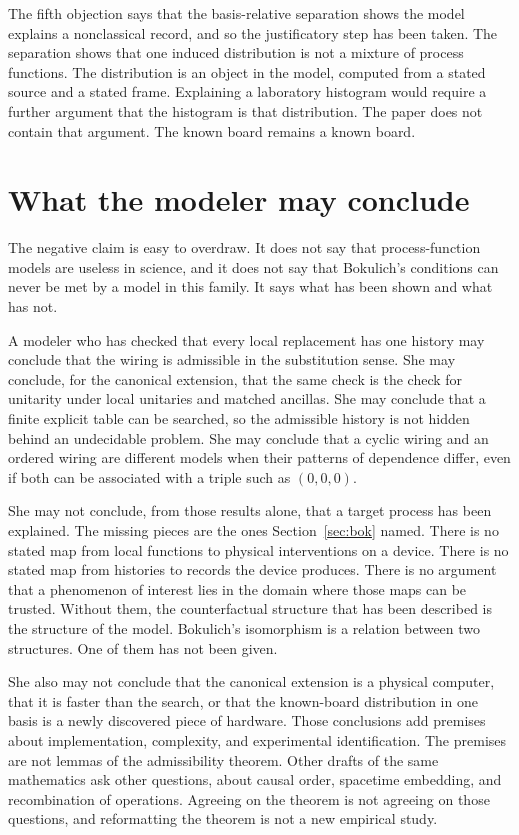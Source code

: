 \documentclass[12pt]{article}
\begin{document}
The fifth objection says that the basis-relative separation shows the model explains a nonclassical record, and so the justificatory step has been taken. The separation shows that one induced distribution is not a mixture of process functions. The distribution is an object in the model, computed from a stated source and a stated frame. Explaining a laboratory histogram would require a further argument that the histogram is that distribution. The paper does not contain that argument. The known board remains a known board.

\section{What the modeler may conclude}
\label{sec:may}

The negative claim is easy to overdraw. It does not say that process-function models are useless in science, and it does not say that Bokulich's conditions can never be met by a model in this family. It says what has been shown and what has not.

A modeler who has checked that every local replacement has one history may conclude that the wiring is admissible in the substitution sense. She may conclude, for the canonical extension, that the same check is the check for unitarity under local unitaries and matched ancillas. She may conclude that a finite explicit table can be searched, so the admissible history is not hidden behind an undecidable problem. She may conclude that a cyclic wiring and an ordered wiring are different models when their patterns of dependence differ, even if both can be associated with a triple such as \((0,0,0)\).

She may not conclude, from those results alone, that a target process has been explained. The missing pieces are the ones Section~\ref{sec:bok} named. There is no stated map from local functions to physical interventions on a device. There is no stated map from histories to records the device produces. There is no argument that a phenomenon of interest lies in the domain where those maps can be trusted. Without them, the counterfactual structure that has been described is the structure of the model. Bokulich's isomorphism is a relation between two structures. One of them has not been given.

She also may not conclude that the canonical extension is a physical computer, that it is faster than the search, or that the known-board distribution in one basis is a newly discovered piece of hardware. Those conclusions add premises about implementation, complexity, and experimental identification. The premises are not lemmas of the admissibility theorem. Other drafts of the same mathematics ask other questions, about causal order, spacetime embedding, and recombination of operations. Agreeing on the theorem is not agreeing on those questions, and reformatting the theorem is not a new empirical study.
\end{document}
